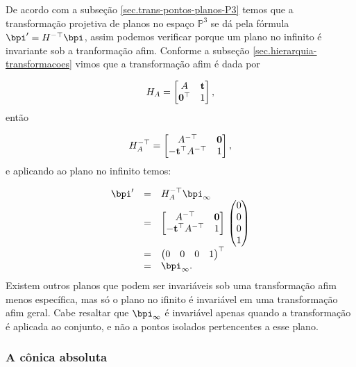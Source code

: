 De acordo com a subseção \ref{sec.trans-pontos-planos-P3} temos que a transformação projetiva de planos no espaço  $\mathbb{P}^3$ se dá pela fórmula $\bpi'=H^{-\top}\bpi$, assim podemos verificar porque um plano no infinito é invariante sob a tranformação afim. Conforme a subseção \ref{sec.hierarquia-transformacoes} vimos que a transformação afim é dada por 

\begin{equation*}
H_A=
\begin{bmatrix}
A&{\bf t}\\
{\bf 0}^\top&1
\end{bmatrix},
\end{equation*}
então

\begin{equation*}
H_A^{-\top}=
\begin{bmatrix}
A^{-\top}&{\bf 0}\\
-{\bf t}^\top A^{-\top}&1
\end{bmatrix},
\end{equation*}
e aplicando ao plano no infinito temos:

\begin{equation*}
\begin{array}{rcl}
\bpi'&=&H_A^{-\top}\bpi_\infty\\
&=&
\begin{bmatrix}
A^{-\top}&{\bf 0}\\
-{\bf t}^\top A^{-\top}&1
\end{bmatrix}\,
\begin{pmatrix}
0\\
0\\
0\\
1
\end{pmatrix}\\
&=&
\begin{pmatrix}
0&0&0&1
\end{pmatrix}^\top\\
&=&
\bpi_\infty.
\end{array}
\end{equation*}
Existem outros planos que podem ser invariáveis sob uma transformação afim menos específica, mas só o plano no ifinito é invariável em uma transformação afim geral. Cabe resaltar que $\bpi_\infty$ é invariável apenas quando a transformação é aplicada ao conjunto, e não a pontos isolados pertencentes a esse plano.


\subsubsection{A cônica absoluta}\label{sec.con-absoluta}

